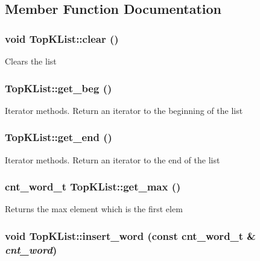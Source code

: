 \subsection{Member Function Documentation}
\hypertarget{class_top_k_list_a4d7e1f2f37373b4b0ff1afd14b2e46fd}{
\subsubsection[{clear}]{\setlength{\rightskip}{0pt plus 5cm}void TopKList::clear ()}}
\label{class_top_k_list_a4d7e1f2f37373b4b0ff1afd14b2e46fd}
Clears the list \hypertarget{class_top_k_list_ae2411dfb7c1fa91c9a28b8787e50b622}{
\subsubsection[{get\_\-beg}]{ TopKList::get\_\-beg ()}}
\label{class_top_k_list_ae2411dfb7c1fa91c9a28b8787e50b622}
Iterator methods. Return an iterator to the beginning of the list \hypertarget{class_top_k_list_a10dc87d4db7605d2afe754a620d10892}{
\subsubsection[{get\_\-end}]{ TopKList::get\_\-end ()}}
\label{class_top_k_list_a10dc87d4db7605d2afe754a620d10892}
Iterator methods. Return an iterator to the end of the list \hypertarget{class_top_k_list_abab1ed86b746442e81eed7ba4235da21}{
\subsubsection[{get\_\-max}]{\setlength{\rightskip}{0pt plus 5cm}cnt\_\-word\_\-t TopKList::get\_\-max ()}}
\label{class_top_k_list_abab1ed86b746442e81eed7ba4235da21}
Returns the max element which is the first elem \hypertarget{class_top_k_list_a04d9d3639b61dcf3587a7595532846ed}{
\subsubsection[{insert\_\-word}]{\setlength{\rightskip}{0pt plus 5cm}void TopKList::insert\_\-word (const cnt\_\-word\_\-t \& {\em cnt\_\-word})}}

